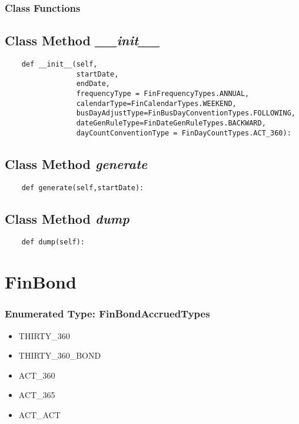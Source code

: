 \documentclass[twoside,11pt]{book}
\begin{document}
\subsubsection{Class Functions}

\subsection{Class Method {\it \_\_init\_\_}}


\begin{lstlisting}
    def __init__(self,
                 startDate,
                 endDate,
                 frequencyType = FinFrequencyTypes.ANNUAL,
                 calendarType=FinCalendarTypes.WEEKEND,
                 busDayAdjustType=FinBusDayConventionTypes.FOLLOWING,
                 dateGenRuleType=FinDateGenRuleTypes.BACKWARD, 
                 dayCountConventionType = FinDayCountTypes.ACT_360):
\end{lstlisting}

\subsection{Class Method {\it generate}}


\begin{lstlisting}
    def generate(self,startDate):
\end{lstlisting}

\subsection{Class Method {\it dump}}


\begin{lstlisting}
    def dump(self):
\end{lstlisting}

\newpage
\section{FinBond}

\subsubsection{Enumerated Type: FinBondAccruedTypes}
\begin{itemize}
\item{THIRTY\_360}
\item{THIRTY\_360\_BOND}
\item{ACT\_360}
\item{ACT\_365}
\item{ACT\_ACT}
\end{itemize}
\end{document}
